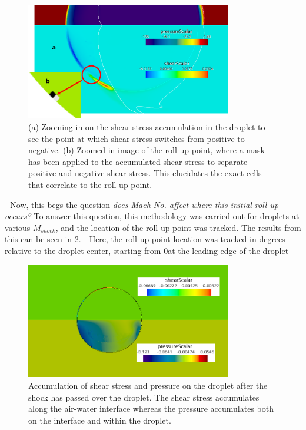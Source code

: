 \documentclass{UCF_ETD}
\begin{document}
\begin{figure}
    \centering
    \includegraphics[width=0.8\textwidth]{Figures/roll_up_points.png}
    \caption{(a) Zooming in on the shear stress accumulation in the droplet to see the point at which shear stress switches from positive to negative. (b) Zoomed-in image of the roll-up point, where a mask has been applied to the accumulated shear stress to separate positive and negative shear stress. This elucidates the exact cells that correlate to the roll-up point.}
    \label{fig:roll_up_points}
\end{figure}

- Now, this begs the question \textit{does Mach No. affect where this initial roll-up occurs?} To answer this question, this methodology was carried out for droplets at various $M_{shock}$, and the location of the roll-up point was tracked. The results from this can be seen in \ref{fig:roll_up_points_data}.
- Here, the roll-up point location was tracked in degrees relative to the droplet center, starting from 0\degree at the leading edge of the droplet

\begin{figure}
    \centering
    \includegraphics[width=0.8\textwidth]{Figures/pressure_and_shear_accumulation.png}
    \caption{Accumulation of shear stress and pressure on the droplet after the shock has passed over the droplet. The shear stress accumulates along the air-water interface whereas the pressure accumulates both on the interface and within the droplet.}
    \label{fig:roll_up_points_data}
\end{figure}
\end{document}
